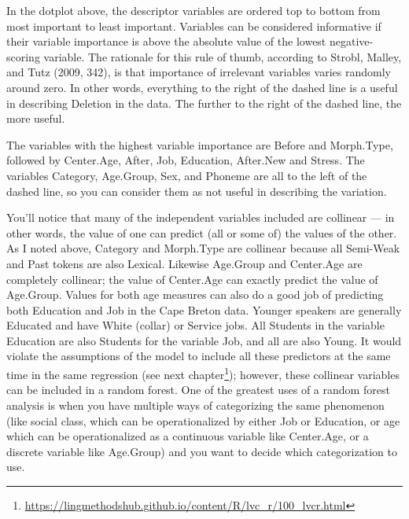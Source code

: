 \documentclass[
  10pt,
  letterpaper]{article}
\renewcommand\texttt[1]{{\ttfamily\color{BrickRed}#1}}
\DeclareRobustCommand{\href}[2]{#2\footnote{\url{#1}}}
\begin{document}
In the dotplot above, the descriptor variables are ordered top to bottom
from most important to least important. Variables can be considered
informative if their variable importance is above the absolute value of
the lowest negative-scoring variable. The rationale for this rule of
thumb, according to Strobl, Malley, and Tutz (2009, 342), is that
importance of irrelevant variables varies randomly around zero. In other
words, everything to the right of the dashed line is a useful in
describing \texttt{Deletion} in the data. The further to the right of
the dashed line, the more useful.

The variables with the highest variable importance are \texttt{Before}
and \texttt{Morph.Type}, followed by \texttt{Center.Age},
\texttt{After}, \texttt{Job}, \texttt{Education}, \texttt{After.New} and
\texttt{Stress}. The variables \texttt{Category}, \texttt{Age.Group},
\texttt{Sex}, and \texttt{Phoneme} are all to the left of the dashed
line, so you can consider them as not useful in describing the
variation.

You'll notice that many of the independent variables included are
collinear --- in other words, the value of one can predict (all or some
of) the values of the other. As I noted above, \texttt{Category} and
\texttt{Morph.Type} are collinear because all \texttt{Semi-Weak} and
\texttt{Past} tokens are also \texttt{Lexical}. Likewise
\texttt{Age.Group} and \texttt{Center.Age} are completely collinear; the
value of \texttt{Center.Age} can exactly predict the value of
\texttt{Age.Group}. Values for both age measures can also do a good job
of predicting both \texttt{Education} and \texttt{Job} in the Cape
Breton data. Younger speakers are generally \texttt{Educated} and have
\texttt{White} (collar) or \texttt{Service} jobs. All \texttt{Students}
in the variable \texttt{Education} are also \texttt{Students} for the
variable \texttt{Job}, and all are also \texttt{Young}. It would violate
the assumptions of the model to include all these predictors at the same
time in the same regression (see
\href{https://lingmethodshub.github.io/content/R/lvc_r/100_lvcr.html}{next
chapter}); however, these collinear variables can be included in a
random forest. One of the greatest uses of a random forest analysis is
when you have multiple ways of categorizing the same phenomenon (like
social class, which can be operationalized by either \texttt{Job} or
\texttt{Education}, or age which can be operationalized as a continuous
variable like \texttt{Center.Age}, or a discrete variable like
\texttt{Age.Group}) and you want to decide which categorization to use.
\end{document}
